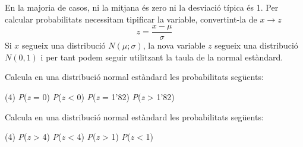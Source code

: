 \begin{theorybox}
	En la majoria de casos, ni la mitjana és zero ni la desviació típica és 1. Per calcular probabilitats necessitam tipificar la variable, convertint-la de $x \rightarrow z$
	\begin{equation*}
	 	z=\frac{x-\mu}{\sigma} 
	\end{equation*}
	 Si $x$ segueix una distribució $N(\mu; \sigma)$, la nova variable $z$ segueix una distribució $N(0,1)$ i per tant podem seguir utilitzant la taula de la normal estàndard. 
\end{theorybox}



\begin{mylist}
	\item
	Calcula en una distribució normal estàndard les probabilitats
	següents: 
	\begin{tasks}(4)
		\task \emph{P}(\emph{z} = 0)
		\task \emph{P}(\emph{z} \textless{} 0)
		\task \emph{P}(\emph{z} = 1'82)
		\task \emph{P}(\emph{z} \textgreater{} 1'82)
	\end{tasks}
	
	\item
	Calcula en una distribució normal estàndard les probabilitats
	següents: 
	\begin{tasks}(4)
		\task \emph{P}(\emph{z} \textgreater{} 4)
		\task \emph{P}(\emph{z}
		\textless{} 4)
		\task \emph{P}(\emph{z} \textgreater{} 1)
		\task \emph{P}(\emph{z} \textless{} 1)
	\end{tasks} 
\end{mylist}

\vspace{2cm}


